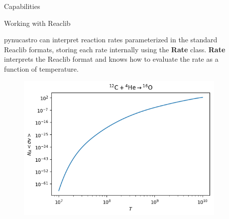 \documentclass[final]{beamer}
\newlength{\sepwid}
\newlength{\onecolwid}
\newlength{\twocolwid}
\newcommand{\isotm}[2]{{}^{#2}\mathrm{#1}}
\begin{document}
\begin{frame}[t]
\begin{columns}[t]
\begin{column}{\onecolwid}
\begin{block}{Capabilities}
\end{block}


\begin{block}{Working with Reaclib}

pynucastro can interpret reaction rates parameterized in the standard
Reaclib formats, storing each rate internally
using the \textbf{Rate} class. \textbf{Rate} interprets the Reaclib
format and knows how to evaluate the rate as a function of
temperature.

\begin{figure}
\includegraphics[width=\linewidth]{figures/library-examples-filtering_cago.png}
\end{figure}

\end{block}

\end{column} %

\begin{column}{\sepwid}\end{column} %

\begin{column}{\twocolwid} %

\begin{columns}[t,totalwidth=\twocolwid] %


\end{columns}
\end{column}
\end{columns}
\end{frame}
\end{document}
